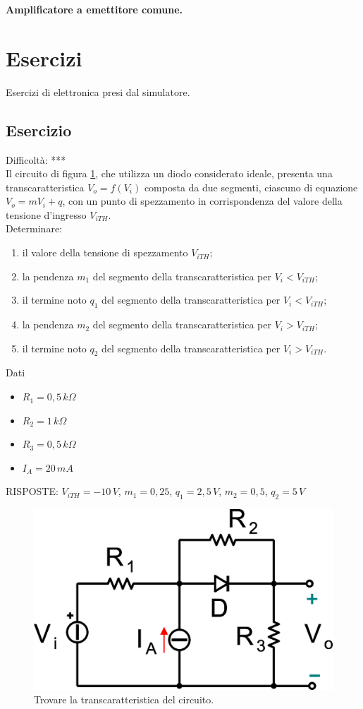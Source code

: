 \documentclass[a4paper,portrait,12pt]{article}
\theoremstyle{definition}
\begin{document}
\textbf{Amplificatore a emettitore comune.}
\bigskip

\section{Esercizi}

Esercizi di elettronica presi dal simulatore.


\subsection{Esercizio}

Difficoltà: ***\\

Il circuito di figura \ref{img:transdiodo1}, che utilizza un diodo considerato ideale, presenta una 
transcaratteristica $V_o = f(V_i)$ composta da due segmenti, ciascuno di equazione $V_o = m V_i + q$, con 
un punto di spezzamento in corrispondenza del valore della tensione d'ingresso $V_{iTH}$.\\ 

Determinare:
\begin{enumerate}
\item il valore della tensione di spezzamento $V_{iTH}$;
\item la pendenza $m_1$ del segmento della transcaratteristica per $V_i < V_{iTH}$;
\item il termine noto $q_1$ del segmento della transcaratteristica per $V_i < V_{iTH}$;
\item la pendenza $m_2$ del segmento della transcaratteristica per $V_i > V_{iTH}$;
\item il termine noto $q_2$ del segmento della transcaratteristica per $V_i > V_{iTH}$.
\end{enumerate}

Dati
\begin{itemize}
\item $R_1=0,5\,k\Omega$ 
\item $R_2=1\,k\Omega$ 
\item $R_3=0,5\,k\Omega$
\item $I_A=20\,mA$
\end{itemize}

RISPOSTE: $V_{iTH} = -10\,V$, $m_1 = 0,25$, $q_1 = 2,5\,V$, $m_2 = 0,5$, $q_2 = 5\,V$

\begin{figure}[H]
\centering
\includegraphics[width=.3\linewidth]{img/elettronicaEs/transdiodo1.pdf}
\caption{Trovare la transcaratteristica del circuito.}
\label{img:transdiodo1}
\end{figure}
\end{document}

